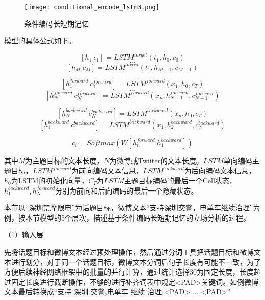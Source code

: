 \begin{figure}[htbp]
	\centering
	\texttt{[image: conditional\_encode\_lstm3.png]}
	\caption[rnn_vanish]{条件编码长短期记忆}
\end{figure}

模型的具体公式如下。

\begin{equation}\label{lstm_f}[h_1~c_1] = LSTM^{target}(t_1,h_0,c_0)\end{equation}
$$...$$
\begin{equation}\label{lstm_f}[h_M~c_M] = LSTM^{target}(t_1,h_{M-1},c_{M-1})\end{equation}

\begin{equation}\label{lstm_f}[h^{forward}_{1}~c^{forward}_{1}] = LSTM^{forward}(x_1,h_0,c_T)\end{equation}
$$...$$
\begin{equation}\label{lstm_f}[h^{forward}_{N}~c^{forward}_{N}] = LSTM^{forward}(x_n,h^{forward}_{N-1},c^{forward}_{N-1})\end{equation}

\begin{equation}\label{lstm_f}[h^{backward}_{N}~c^{backward}_{N}] = LSTM^{backward}(x_n,h_0,c_T)\end{equation}
$$...$$
\begin{equation}\label{lstm_f}[h^{backward}_{1}~c^{backward}_{1}] = LSTM^{backward}(x_1,h^{backward}_{2},c^{backward}_{2})\end{equation}

\begin{equation}\label{lstm_f}c_i=Softmax(W[h^{forward}_n~h^{backward}_1])\end{equation}

其中$M$为主题目标的文本长度，$N$为微博或Twiiter的文本长度。$LSTM$单向编码主题目标，$LSTM^{forward}$为前向编码文本信息，$LSTM^{backward}$为后向编码文本信息，$h_0$为LSTM的初始化向量，$C_T$为$LSTM$主题目标编码的最后一个Cell状态，$h^{backward}_{1},h^{forward}_{N}$分别为前向和后向编码的最后一个隐藏状态。

本节以“深圳禁摩限电”为话题目标，微博文本“支持深圳交警，电单车继续治理”为例，按本节模型的5个层次，描述基于条件编码长短期记忆的立场分析的过程。

（1）输入层

先将话题目标和微博文本经过预处理操作，然后通过分词工具把话题目标和微博文本进行划分，对于同一个话题目标，微博文本分词后句子长度有可能不一致，为了方便后续神经网络框架中的批量的并行计算，通过统计选择30为固定长度，长度超过固定长度进行截断操作，不够的进行补齐词表中规定<PAD>关键词。如例微博文本最后转换成“支持 深圳 交警,电单车 继续 治理 <PAD> ... <PAD>”

